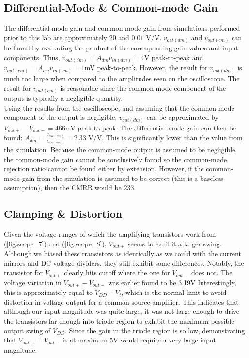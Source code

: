 \subsection{Differential-Mode \& Common-mode Gain}

The differential-mode gain and common-mode gain from simulations performed prior to this lab are approximately $20$ and $0.01$ \si{\volt}/\si{\volt}.
$v_{out(dm)}$ and $v_{out(cm)}$ can be found by evaluating the product of the corresponding gain values and input components.
Thus, $v_{out(dm)} = A_{dm}v_{in(dm)} = 4$\si{\volt} peak-to-peak and $v_{out(cm)} = A_{cm}v_{in(cm)} = 1$\si{\milli\volt} peak-to-peak.
However, the result for $v_{out(dm)}$ is much too large when compared to the amplitudes seen on the oscilloscope.
The result for $v_{out(cm)}$ is reasonable since the common-mode component of the output is typically a negligible quantity. \\

Using the results from the oscilloscope, and assuming that the common-mode component of the output is negligible, $v_{out(dm)}$ can be approximated by $V_{out+} - V_{out-} = 466$\si{\milli\volt} peak-to-peak.
The differential-mode gain can then be found: $A_{dm} = \frac{v_{out(dm)}}{v_{in(dm)}} = 2.33$ \si{\volt}/\si{\volt}.
This is significantly lower than the value from the simulation.
Because the common-mode output is assumed to be negligible, the common-mode gain cannot be conclusively found so the common-mode rejection ratio cannot be found either by extension.
However, if the common-mode gain from the simulation is assumed to be correct (this is a baseless assumption), then the CMRR would be $233$. \\

\subsection{Clamping \& Distortion}

Given the voltage ranges of which the amplifying transistors work from (\ref{fig:scope_7}) and (\ref{fig:scope_8}), $V_{out+}$ seems to exhibit a larger swing.
Although we biased these transistors as identically as we could with the current mirrors and DC voltage dividers, they still exhibit some differences.
Notably, the transistor for $V_{out+}$ clearly hits cutoff where the one for $V_{out-}$ does not.
The voltage variation in $V_{out+} - V_{out-}$ was earlier found to be 3.19\si{\volt}
Interestingly, this is approximately equal to $V_{DD} - V_{t}$, which is the normal limit to avoid distortion in voltage output for a common-source amplifier.
This indicates that although our input magnitude was quite large, it was not large enough to drive the transistors far enough into triode region to exhibit the maximum possible output swing of $V_{DD}$.
Since the gain in the triode region is so low, demonstrating that $V_{out+} - V_{out-}$ is at maximum 5V would require a very large input magnitude.

